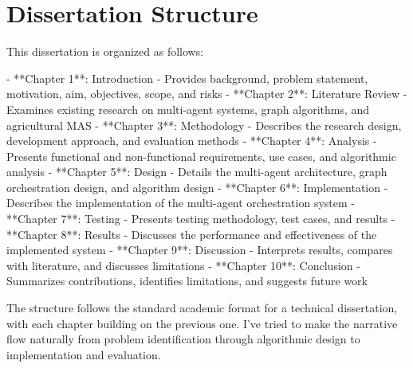 \section{Dissertation Structure}

This dissertation is organized as follows:

- **Chapter 1**: Introduction - Provides background, problem statement, motivation, aim, objectives, scope, and risks
- **Chapter 2**: Literature Review - Examines existing research on multi-agent systems, graph algorithms, and agricultural MAS
- **Chapter 3**: Methodology - Describes the research design, development approach, and evaluation methods
- **Chapter 4**: Analysis - Presents functional and non-functional requirements, use cases, and algorithmic analysis
- **Chapter 5**: Design - Details the multi-agent architecture, graph orchestration design, and algorithm design
- **Chapter 6**: Implementation - Describes the implementation of the multi-agent orchestration system
- **Chapter 7**: Testing - Presents testing methodology, test cases, and results
- **Chapter 8**: Results - Discusses the performance and effectiveness of the implemented system
- **Chapter 9**: Discussion - Interprets results, compares with literature, and discusses limitations
- **Chapter 10**: Conclusion - Summarizes contributions, identifies limitations, and suggests future work

The structure follows the standard academic format for a technical dissertation, with each chapter building on the previous one. I've tried to make the narrative flow naturally from problem identification through algorithmic design to implementation and evaluation.
